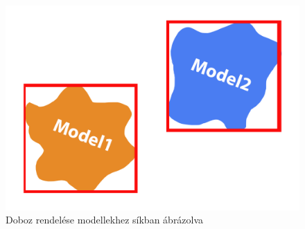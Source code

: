 \begin{figure}[h]
	\centering
	\includegraphics[width=13truecm, height=7.5truecm]{images/con1.png}
	\caption{Doboz rendelése modellekhez síkban ábrázolva}
	\label{fig:con_1}
\end{figure}


\newpage
